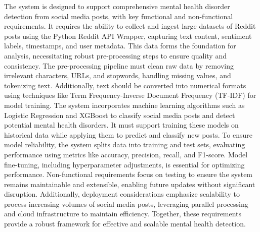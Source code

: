 \vspace{1em}
\noindent
The system is designed to support comprehensive mental health disorder detection from social media posts, with key functional and non-functional requirements. It requires the ability to collect and ingest large datasets of Reddit posts using the Python Reddit API Wrapper, capturing text content, sentiment labels, timestamps, and user metadata. This data forms the foundation for analysis, necessitating robust pre-processing steps to ensure quality and consistency. The pre-processing pipeline must clean raw data by removing irrelevant characters, URLs, and stopwords, handling missing values, and tokenizing text. Additionally, text should be converted into numerical formats using techniques like Term Frequency-Inverse Document Frequency (TF-IDF) for model training. The system incorporates machine learning algorithms such as Logistic Regression and XGBoost to classify social media posts and detect potential mental health disorders. It must support training these models on historical data while applying them to predict and classify new posts. To ensure model reliability, the system splits data into training and test sets, evaluating performance using metrics like accuracy, precision, recall, and F1-score. Model fine-tuning, including hyperparameter adjustments, is essential for optimizing performance. Non-functional requirements focus on testing to ensure the system remains maintainable and extensible, enabling future updates without significant disruption. Additionally, deployment considerations emphasize scalability to process increasing volumes of social media posts, leveraging parallel processing and cloud infrastructure to maintain efficiency. Together, these requirements provide a robust framework for effective and scalable mental health detection.

